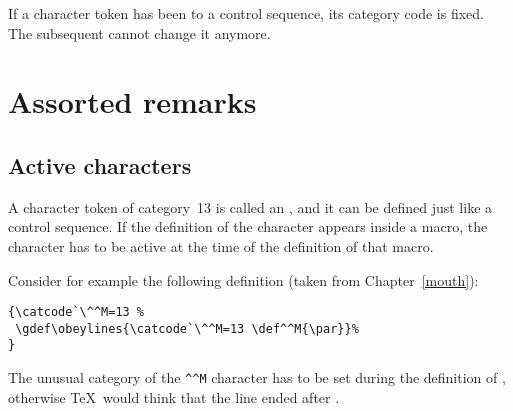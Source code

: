 If a character token has been  to a control
sequence, its category code is fixed.
The subsequent  cannot change
it anymore.

\section{Assorted remarks}

\subsection{Active characters}

A character token of category~13 is called an
, and it
can be defined just like a control sequence.
If the definition of the character appears inside a macro,
the character has to be active at the time of the definition
of that macro.

Consider for example the following definition
(taken from Chapter~\ref{mouth}):
\begin{verbatim}
{\catcode`\^^M=13 %
 \gdef\obeylines{\catcode`\^^M=13 \def^^M{\par}}%
}
\end{verbatim}
The unusual category of the \verb>^^M> character
has to be set during the definition of ,
otherwise \TeX\ would think that the line ended
after .

